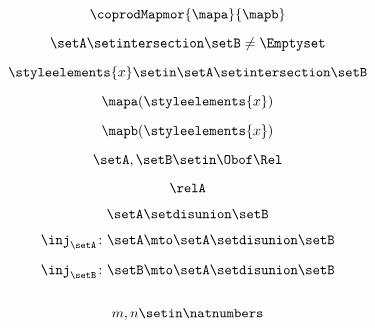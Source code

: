 {\begin{forslides}
    \begin{equation}
        \label{eq:feedback-114}
        \coprodMapmor{\mapa}{\mapb}
    \end{equation}

    \begin{equation}
        \label{eq:feedback-115}
        \setA\setintersection \setB\neq \Emptyset
    \end{equation}

    \begin{equation}
        \label{eq:feedback-116}
        \styleelements{x}\setin \setA\setintersection \setB
    \end{equation}

    \begin{equation}
        \label{eq:feedback-117}
        \mapa(\styleelements{x})
    \end{equation}

    \begin{equation}
        \label{eq:feedback-118}
        \mapb(\styleelements{x})
    \end{equation}

    \begin{equation}
        \label{eq:feedback-119}
        \setA,\setB\setin \Obof\Rel
    \end{equation}

    \begin{equation}
        \label{eq:feedback-120}
        \relA
    \end{equation}

    \begin{equation}
        \label{eq:feedback-121}
        \setA \setdisunion \setB
    \end{equation}

    \begin{equation}
        \label{eq:feedback-122}
        \inj_\setA\colon \setA\mto \setA \setdisunion\setB
    \end{equation}

    \begin{equation}
        \label{eq:feedback-123}
        \inj_\setB\colon \setB\mto \setA \setdisunion\setB
    \end{equation}

    \begin{equation}
        \label{eq:feedback-124}
    \end{equation}

    \begin{equation}
        \label{eq:feedback-125}
        m,n\setin \natnumbers
    \end{equation}


\end{forslides}}
